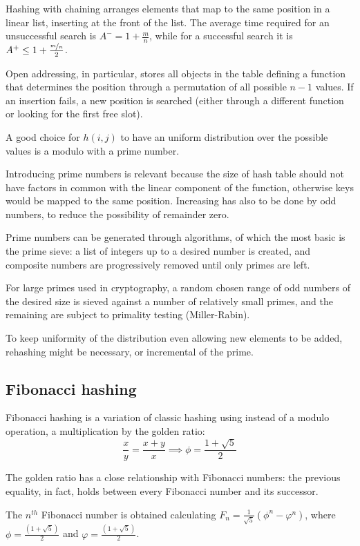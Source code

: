 Hashing with chaining arranges elements that map to the same position in a linear list, inserting at the front of the list. The average time required for an unsuccessful search is $A^- = 1 + \frac{m}{n}$, while for a successful search it is $A^+ \leq 1 + \frac{\nicefrac{m}{n}}{2}$.

Open addressing, in particular, stores all objects in the table defining a function that determines the position through a permutation of all possible $n - 1$ values. If an insertion fails, a new position is searched (either through a different function or looking for the first free slot).

A good choice for $h(i, j)$ to have an uniform distribution over the possible values is a modulo with a prime number.

Introducing prime numbers is relevant because the size of hash table should not have factors in common with the linear component of the function, otherwise keys would be mapped to the same position. Increasing has also to be done by odd numbers, to reduce the possibility of remainder zero.

Prime numbers can be generated through algorithms, of which the most basic is the prime sieve: a list of integers up to a desired number is created, and composite numbers are progressively removed until only primes are left. 

For large primes used in cryptography, a random chosen range of odd numbers of the desired size is sieved against a number of relatively small primes, and the remaining are subject to primality testing (Miller-Rabin).

To keep uniformity of the distribution even allowing new elements to be added, rehashing might be necessary, or incremental of the prime.

\subsection{Fibonacci hashing}
Fibonacci hashing is a variation of classic hashing using instead of a modulo operation, a multiplication by the golden ratio:
$$\frac{x}{y} = \frac{x + y}{x} \implies \phi = \frac{1 + \sqrt{5}}{2}$$

The golden ratio has a close relationship with Fibonacci numbers: the previous equality, in fact, holds between every Fibonacci number and its successor.

The $n^{th}$ Fibonacci number is obtained calculating $F_n = \frac{1}{\sqrt{5}}(\phi^n - \varphi^n)$, where $\phi = \frac{(1 + \sqrt{5})}{2}$ and $\varphi = \frac{(1 + \sqrt{5})}{2}$.


